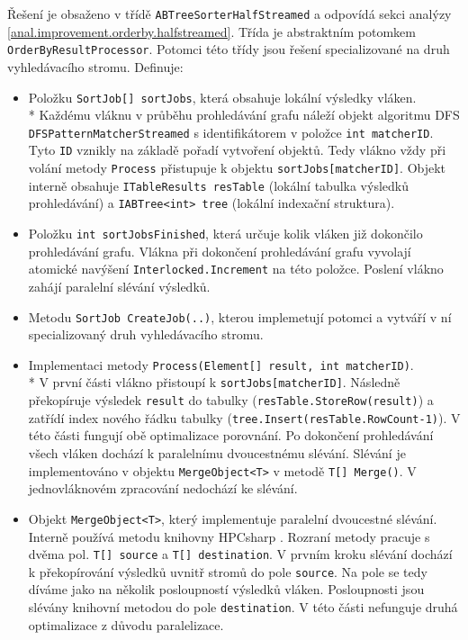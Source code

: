 Řešení je obsaženo v třídě \texttt{ABTreeSorterHalfStreamed} a odpovídá sekci analýzy \ref{anal.improvement.orderby.halfstreamed}.
Třída je abstraktním potomkem \texttt{OrderByResultProcessor}.
Potomci této třídy jsou řešení specializované na druh vyhledávacího stromu.
Definuje:
\begin{itemize}

\item Položku \texttt{SortJob[] sortJobs}, která obsahuje lokální výsledky vláken. \\*
Každému vláknu v průběhu prohledávání grafu náleží objekt algoritmu DFS \texttt{DFSPatternMatcherStreamed} s identifikátorem v položce \texttt{int matcherID}.
Tyto \texttt{ID} vznikly na základě pořadí vytvoření objektů.
Tedy vlákno vždy při volání metody \texttt{Process} přistupuje k objektu \texttt{sortJobs[matcherID]}. 
Objekt interně obsahuje \texttt{ITableResults resTable} (lokální tabulka výsledků prohledávání) a \texttt{IABTree<int> tree} (lokální indexační struktura).

\item Položku \texttt{int sortJobsFinished}, která určuje kolik vláken již dokončilo prohledávání grafu.
Vlákna při dokončení prohledávání grafu vyvolají atomické navýšení \texttt{Interlocked.Increment} na této položce.
Poslení vlákno zahájí paralelní slévání výsledků.

\item Metodu \texttt{SortJob CreateJob(..)}, kterou implemetují potomci a vytváří v ní specializovaný druh vyhledávacího stromu.

\item Implementaci metody \texttt{Process(Element[] result, int matcherID)}.\\*
V první části vlákno přistoupí k \texttt{sortJobs[matcherID]}. 
Následně překopíruje výsledek \texttt{result} do tabulky (\texttt{resTable.StoreRow(result)}) a zatřídí index nového řádku tabulky (\texttt{tree.Insert(resTable.RowCount-1)}).
V této části fungují obě optimalizace porovnání.
Po dokončení prohledávání všech vláken dochází k paralelnímu dvoucestnému slévání.
Slévání je implementováno v objektu \texttt{MergeObject<T>} v metodě \texttt{T[] Merge()}.
V jednovláknovém zpracování nedochází ke slévání.
\item Objekt \texttt{MergeObject<T>}, který implementuje paralelní dvoucestné slévání.
Interně používá metodu knihovny HPCsharp \citep{hpcsharp}.
Rozraní metody pracuje s dvěma pol. 
\texttt{T[] source} a \texttt{T[] destination}.
V prvním kroku slévání dochází k překopírování výsledků uvnitř stromů do pole \texttt{source}.
Na pole se tedy díváme jako na několik posloupností výsledků vláken.
Posloupnosti jsou slévány knihovní metodou do pole \texttt{destination}.
V této části nefunguje druhá optimalizace z důvodu paralelizace.
\end{itemize}
